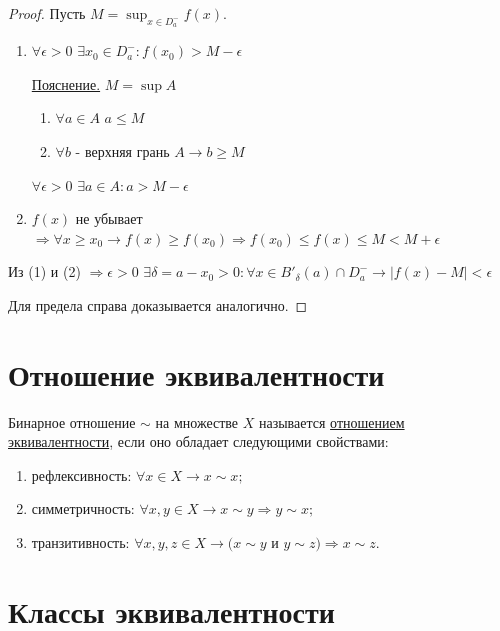 	\begin{proof}
		Пусть $M = \sup_{x \in D^-_a} f(x).$
		\begin{enumerate}
			\item $\forall \epsilon > 0$ $\exists x_0 \in D^-_a : f(x_0) > M - \epsilon$
			
			\underline{Пояснение.} $M = \sup{A}$
			\begin{enumerate}
				\item $\forall a \in A$ $a \leqslant M$
				\item $\forall b$ - верхняя грань $A \rightarrow b \geqslant M$
			\end{enumerate}
			$\forall \epsilon > 0$ $\exists a \in A: a > M - \epsilon$
			\item $f(x)$ не убывает $\Rightarrow \forall x \geqslant x_0 \rightarrow f(x) \geqslant f(x_0) \Rightarrow f(x_0) \leqslant f(x) \leqslant M < M + \epsilon$
		\end{enumerate}
		Из (1) и (2) $\Rightarrow \epsilon > 0$ $\exists \delta = a - x_0 > 0: \forall x \in B'_{\delta}(a) \cap D^-_a \rightarrow |f(x) - M| < \epsilon$
		
		Для предела справа доказывается аналогично.
	\end{proof}
	
	\section{Отношение эквивалентности}
	
	\begin{definition}
		Бинарное отношение $\sim$ на множестве $X$ называется \newline \underline{отношением эквивалентности}, если оно обладает следующими свойствами:
		\begin{enumerate}
			\item рефлексивность: $\forall x \in X \rightarrow x \sim x;$
			\item симметричность: $\forall x, y \in X \rightarrow x \sim y \Rightarrow y \sim x;$
			\item транзитивность: $\forall x, y, z \in X \rightarrow (x \sim y$ и $y \sim z) \Rightarrow x \sim z.$ 
		\end{enumerate} 
	\end{definition}
	
	\section{Классы эквивалентности}
	
